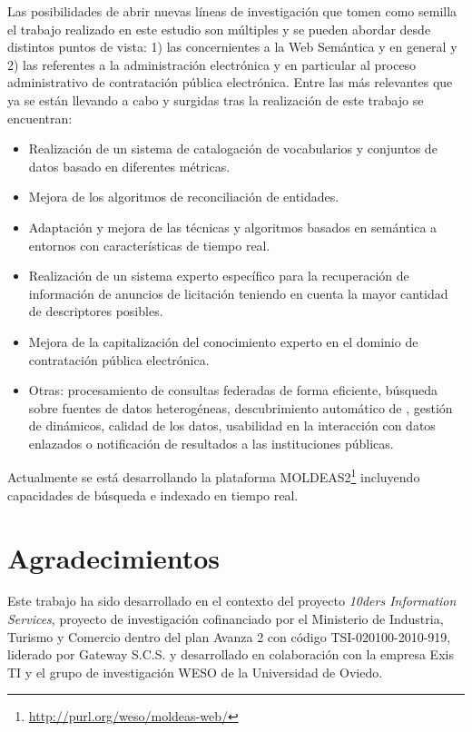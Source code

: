 \documentclass[a4paper,final,11pt,fleqn,twoside]{book}  %
\begin{document}
Las posibilidades de abrir nuevas líneas de investigación que tomen como semilla el trabajo realizado en este estudio son múltiples 
y se pueden abordar desde distintos puntos de vista: 1) las concernientes a la Web Semántica y \linkeddata en general y 
2) las referentes a la administración electrónica y en particular al proceso administrativo de contratación pública electrónica. Entre 
las más relevantes que ya se están llevando a cabo y surgidas tras la realización de este trabajo se encuentran:
\begin{itemize}
 \item Realización de un sistema de catalogación de vocabularios y conjuntos de datos basado en diferentes métricas.
 \item Mejora de los algoritmos de reconciliación de entidades.
 \item Adaptación y mejora de las técnicas y algoritmos basados en semántica a entornos con características de tiempo real.
 \item Realización de un sistema experto específico para la recuperación de información de anuncios de licitación teniendo en cuenta la mayor cantidad de descriptores posibles.
 \item Mejora de la capitalización del conocimiento experto en el dominio de contratación pública electrónica.
 \item Otras: procesamiento de consultas federadas de forma eficiente, búsqueda sobre fuentes de datos heterogéneas, 
 descubrimiento automático de \datasets, gestión de \datasets dinámicos, calidad de los datos, usabilidad en la interacción con datos enlazados o 
 notificación de resultados a las instituciones públicas.
\end{itemize}

Actualmente se está desarrollando la plataforma MOLDEAS2\footnote{\url{http://purl.org/weso/moldeas-web/}} incluyendo capacidades de búsqueda e indexado en tiempo real.

\section*{Agradecimientos}
Este trabajo ha sido desarrollado en el contexto del proyecto \textit{10ders Information Services}, proyecto de investigación
cofinanciado por el Ministerio de Industria, Turismo y Comercio dentro del plan Avanza 2 con código TSI-020100-2010-919, 
liderado por Gateway S.C.S. y desarrollado en colaboración con la empresa Exis TI y el grupo de investigación WESO de la Universidad de Oviedo. 
\end{document}
